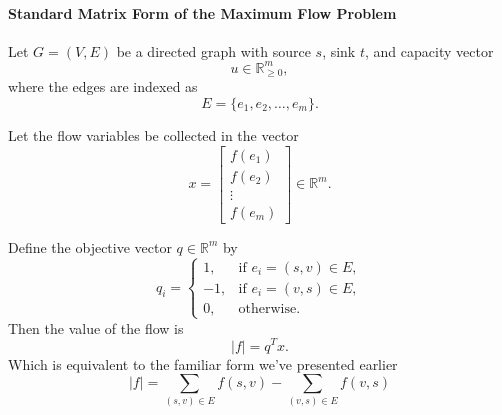 \documentclass[12pt, openany]{article}
\begin{document}
\paragraph{Standard Matrix Form of the Maximum Flow Problem}

Let \(G=(V,E)\) be a directed graph with source \(s\), sink \(t\), and capacity vector
\[
u \in \mathbb{R}^m_{\ge 0},
\]
where the edges are indexed as
\[
E=\{e_1,e_2,\dots,e_m\}.
\]

Let the flow variables be collected in the vector
\[
x=\begin{bmatrix}
f(e_1)\\
f(e_2)\\
\vdots\\
f(e_m)
\end{bmatrix}\in\mathbb{R}^m.
\]

Define the objective vector \(q \in \mathbb{R}^m\) by
\[
q_i =
\begin{cases}
1, & \text{if } e_i=(s,v)\in E, \\[4pt]
-1, & \text{if } e_i=(v,s)\in E, \\[4pt]
0, & \text{otherwise.}
\end{cases}
\]
Then the value of the flow is
\[
|f| = q^T x.
\]
Which is equivalent to the familiar form we've presented earlier
\[
|f|
=
\sum_{(s,v)\in E} f(s,v)
-
\sum_{(v,s)\in E} f(v,s)
\]
\end{document}
